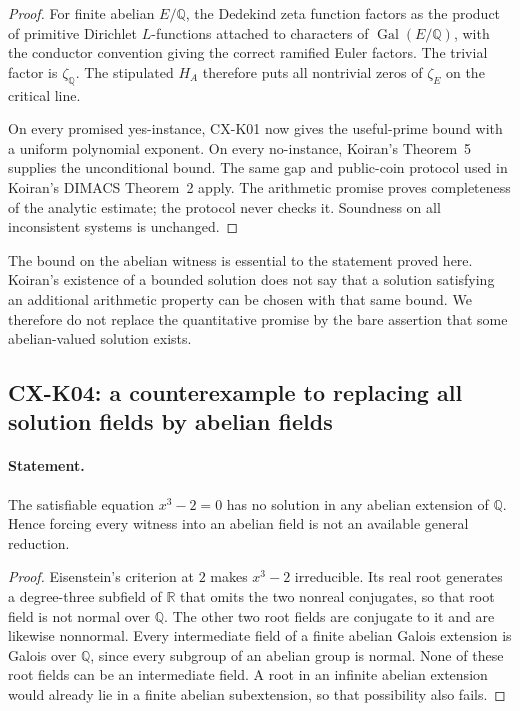 \documentclass[11pt,a4paper]{article}
\begin{document}
\begin{proof}
For finite abelian $E/\mathbb Q$, the Dedekind zeta function factors
as the product of primitive Dirichlet $L$-functions attached to
characters of $\operatorname{Gal}(E/\mathbb Q)$, with the conductor
convention giving the correct ramified Euler factors. The trivial
factor is $\zeta_{\mathbb Q}$. The stipulated $H_A$ therefore puts
all nontrivial zeros of $\zeta_E$ on the critical line.

On every promised yes-instance, CX-K01 now gives the useful-prime
bound with a uniform polynomial exponent. On every no-instance,
Koiran's Theorem~5 supplies the unconditional bound. The same gap
and public-coin protocol used in Koiran's DIMACS Theorem~2 apply.
The arithmetic promise proves completeness of the analytic estimate;
the protocol never checks it. Soundness on all inconsistent systems
is unchanged.
\end{proof}

The bound on the abelian witness is essential to the statement proved
here. Koiran's existence of a bounded solution does not say that a
solution satisfying an additional arithmetic property can be chosen
with that same bound. We therefore do not replace the quantitative
promise by the bare assertion that some abelian-valued solution exists.

\subsection{CX-K04: a counterexample to replacing all solution fields by abelian fields}
\label{cx:k04}

\paragraph{Statement.}
The satisfiable equation $x^3-2=0$ has no solution in any abelian
extension of $\mathbb Q$. Hence forcing every witness into an abelian
field is not an available general reduction.

\begin{proof}
Eisenstein's criterion at $2$ makes $x^3-2$ irreducible. Its real root
generates a degree-three subfield of $\mathbb R$ that omits the two
nonreal conjugates, so that root field is not normal over $\mathbb Q$.
The other two root fields are conjugate to it and are likewise
nonnormal. Every intermediate field of a finite abelian Galois
extension is Galois over $\mathbb Q$, since every subgroup of an
abelian group is normal. None of these root fields can be an
intermediate field. A root in an infinite abelian extension would
already lie in a finite abelian subextension, so that possibility
also fails.
\end{proof}
\end{document}
